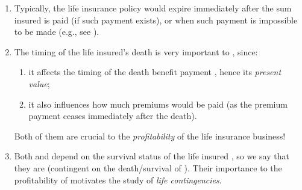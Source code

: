 \begin{enumerate}
\begin{note}
From this we can observe a potential issue: if the death of 
causes no harm to  at all, then the policy may \emph{incentivize}
 to \textcolor{red}{\emph{kill}} ! To deal with this
problem, the underwriting process would ensure the policy  is only
sold to  that has , i.e., the death of the
life insured  should make the policyholder  quite worse
off.\footnote{Expressing differently, it is of interest to  when
 is alive --- survival of  gives some benefits to
.}
\end{note}

\item Typically, the life insurance policy would expire immediately after
the sum insured is paid (if such payment exists), or when such payment is
impossible to be made (e.g., see ).

\item The timing of the life insured's death  is very important to
, since:
\begin{enumerate}
\item it affects the timing of the death benefit payment
, hence its \emph{present value};

\item it also influences how much premiums  would be paid
(as the premium payment ceases immediately after the death).
\end{enumerate}
Both of them are crucial to the \emph{profitability}
 of the life insurance business!

\item Both  and  depend on the
survival status of the life insured , so we say that they are
 (contingent on the death/survival of ).
Their importance to the profitability of  motivates the study
of \emph{life contingencies}.
\end{enumerate}

